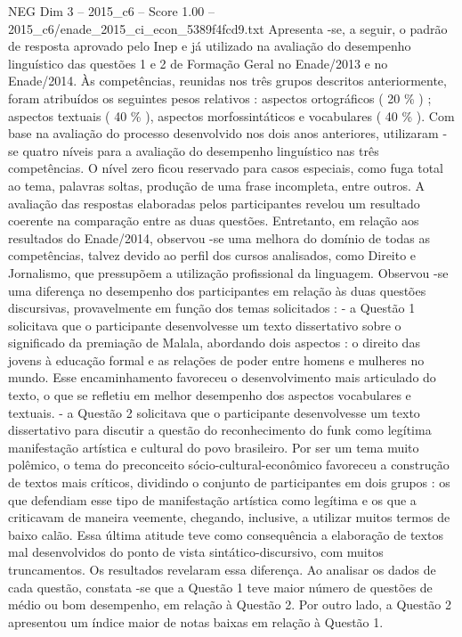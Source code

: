 \begin{textsample}{NEG Dim 3 – 2015\_c6 – Score 1.00 – 2015\_c6/enade\_2015\_ci\_econ\_5389f4fcd9.txt}
Apresenta -se, a seguir, o padrão de resposta aprovado pelo Inep e já utilizado na avaliação do desempenho linguístico das questões 1 e 2 de Formação Geral no Enade/2013 e no Enade/2014.
Às competências, reunidas nos três grupos descritos anteriormente, foram atribuídos os seguintes pesos relativos : aspectos ortográficos ( 20 \% ) ; aspectos textuais ( 40 \% ), aspectos morfossintáticos e vocabulares ( 40 \% ).
Com base na avaliação do processo desenvolvido nos dois anos anteriores, utilizaram -se quatro níveis para a avaliação do desempenho linguístico nas três competências.
O nível zero ficou reservado para casos especiais, como fuga total ao tema, palavras soltas, produção de uma frase incompleta, entre outros.
A avaliação das respostas elaboradas pelos participantes revelou um resultado coerente na comparação entre as duas questões.
Entretanto, em relação aos resultados do Enade/2014, observou -se uma melhora do domínio de todas as competências, talvez devido ao perfil dos cursos analisados, como Direito e Jornalismo, que pressupõem a utilização profissional da linguagem.
Observou -se uma diferença no desempenho dos participantes em relação às duas questões discursivas, provavelmente em função dos temas solicitados : - a Questão 1 solicitava que o participante desenvolvesse um texto dissertativo sobre o significado da premiação de Malala, abordando dois aspectos : o direito das jovens à educação formal e as relações de poder entre homens e mulheres no mundo.
Esse encaminhamento favoreceu o desenvolvimento mais articulado do texto, o que se refletiu em melhor desempenho dos aspectos vocabulares e textuais. - a Questão 2 solicitava que o participante desenvolvesse um texto dissertativo para discutir a questão do reconhecimento do funk como legítima manifestação artística e cultural do povo brasileiro.
Por ser um tema muito polêmico, o tema do preconceito sócio-cultural-econômico favoreceu a construção de textos mais críticos, dividindo o conjunto de participantes em dois grupos : os que defendiam esse tipo de manifestação artística como legítima e os que a criticavam de maneira veemente, chegando, inclusive, a utilizar muitos termos de baixo calão.
Essa última atitude teve como consequência a elaboração de textos mal desenvolvidos do ponto de vista sintático-discursivo, com muitos truncamentos.
Os resultados revelaram essa diferença.
Ao analisar os dados de cada questão, constata -se que a Questão 1 teve maior número de questões de médio ou bom desempenho, em relação à Questão 2.
Por outro lado, a Questão 2 apresentou um índice maior de notas baixas em relação à Questão 1.

\end{textsample}

